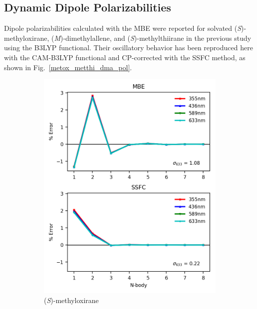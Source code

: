     \subsection{Dynamic Dipole Polarizabilities}
    Dipole polarizabilities calculated with the MBE were reported for solvated (\textit{S})-methyloxirane, (\textit{M})-dimethylallene, and (\textit{S})-methylthiirane in the previous study\cite{Mach2014} using the B3LYP functional. Their oscillatory behavior has been reproduced here with the CAM-B3LYP functional and CP-corrected with the SSFC method, as shown in Fig.\ \ref{metox_metthi_dma_pol}.
        \begin{figure}
            \begin{subfigure}{0.5\textwidth}
                \centering
                \includegraphics[scale=0.75]{p1/graphs/metox_7_pol.png}
                \caption{(\textit{S})-methyloxirane}
                \label{metox_7_pol}
            \end{subfigure}%
            \begin{subfigure}{0.5\textwidth}

\end{subfigure}
\end{figure}
